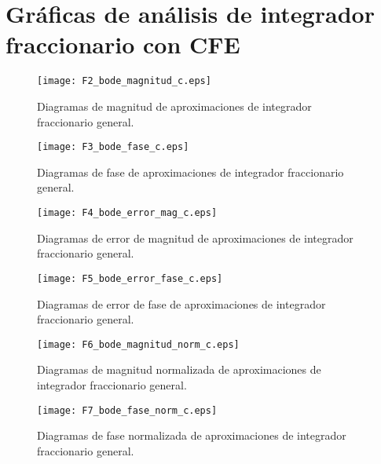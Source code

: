 \chapter{Gráficas de análisis de integrador fraccionario con CFE}

\begin{figure}[hbtp]
	\caption{Diagramas de magnitud de aproximaciones de integrador fraccionario general.}
	\centering
	\texttt{[image: F2\_bode\_magnitud\_c.eps]}
\end{figure}

\begin{figure}[hbtp]
	\caption{Diagramas de fase de aproximaciones de integrador fraccionario general.}
	\centering
	\texttt{[image: F3\_bode\_fase\_c.eps]}
\end{figure}

\begin{figure}[hbtp]
	\caption{Diagramas de error de magnitud de aproximaciones de integrador fraccionario general.}
	\centering
	\texttt{[image: F4\_bode\_error\_mag\_c.eps]}
\end{figure}

\begin{figure}[hbtp]
	\caption{Diagramas de error de fase de aproximaciones de integrador fraccionario general.}
	\centering
	\texttt{[image: F5\_bode\_error\_fase\_c.eps]}
\end{figure}

\begin{figure}[hbtp]
	\caption{Diagramas de magnitud normalizada de aproximaciones de integrador fraccionario general.}
	\centering
	\texttt{[image: F6\_bode\_magnitud\_norm\_c.eps]}
\end{figure}

\begin{figure}[hbtp]
	\caption{Diagramas de fase normalizada de aproximaciones de integrador fraccionario general.}
	\centering
	\texttt{[image: F7\_bode\_fase\_norm\_c.eps]}
\end{figure}

